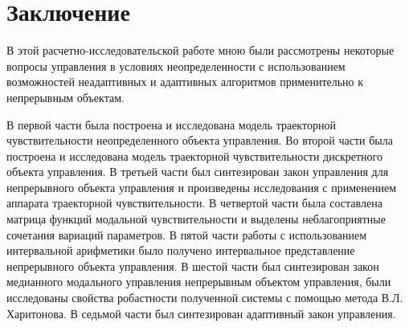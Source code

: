 \newpage
\section{Заключение}

В этой расчетно-исследовательской работе мною были рассмотрены некоторые вопросы управления в условиях неопределенности с использованием возможностей неадаптивных и адаптивных алгоритмов применительно к непрерывным объектам.

В первой части была построена и исследована модель траекторной чувствительности неопределенного объекта управления.
Во второй части была построена и исследована модель траекторной чувствительности дискретного объекта управления.
В третьей части был синтезирован закон управления для непрерывного объекта управления и произведены исследования с применением аппарата траекторной чувствительности.
В четвертой части была составлена матрица функций модальной чувствительности и выделены неблагоприятные сочетания вариаций параметров.
В пятой части работы с использованием интервальной арифметики было получено интервальное представление непрерывного объекта управления.
В шестой части был синтезирован закон медианного модального управления непрерывным объектом управления, были исследованы свойства робастности полученной системы с помощью метода В.Л. Харитонова.
В седьмой части был синтезирован адаптивный закон управления.

\newpage 